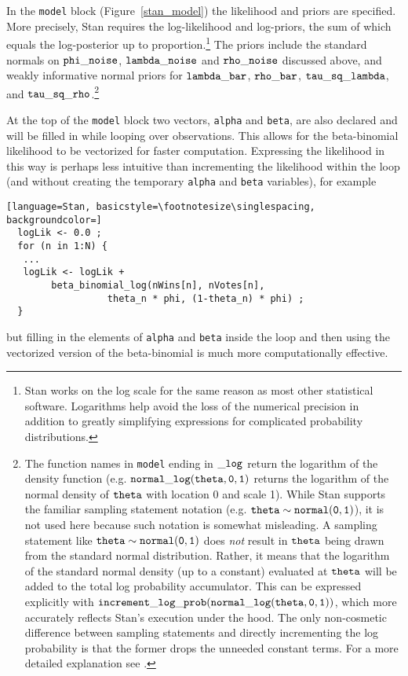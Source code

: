 In the {\tt model} block (Figure~\ref{stan_model}) the likelihood and priors are specified. More 
precisely, Stan requires the log-likelihood and log-priors, the sum of which equals the log-posterior 
up to proportion.\footnote{Stan works on the log scale for the same reason as most 
other statistical software. Logarithms help avoid the loss of the numerical precision in addition to 
greatly simplifying expressions for complicated probability distributions.}
The priors include the standard normals on ${\tt phi\_noise}$, ${\tt lambda\_noise}$ and ${\tt rho\_noise}$ 
discussed above, and weakly informative normal priors for 
${\tt lambda\_bar}$, ${\tt rho\_bar}$, ${\tt tau\_sq\_lambda}$, 
and ${\tt tau\_sq\_rho}$.\footnote{The function names in {\tt model} 
ending in ${\tt\_log}$ return the logarithm of the density function (e.g. ${\tt normal\_log(theta,0,1)}$ 
returns the logarithm of the normal density of ${\tt theta}$  with location 0 and scale 1). While Stan  
supports the familiar sampling statement notation (e.g. ${\tt theta \sim normal(0,1)}$), it is not 
used here because such notation is somewhat misleading. A sampling statement like 
${\tt theta \sim normal(0,1)}$ does {\it not} result in ${\tt theta}$ being drawn from the standard 
normal distribution. Rather, it means that the logarithm of the standard normal density (up to a constant) 
evaluated at ${\tt theta}$ will be added to the total log probability accumulator. This can be expressed 
explicitly with ${\tt increment\_log\_prob(normal\_log(theta,0,1))}$, which more accurately reflects 
Stan's execution under the hood. The only non-cosmetic difference between sampling statements and directly 
incrementing the log probability is that the former drops the unneeded constant terms. For a more detailed 
explanation see .}  

At the top of the {\tt model} block two vectors, {\tt alpha} and {\tt beta}, are also declared 
and will be filled in while looping over observations. This allows for the beta-binomial likelihood 
to be vectorized for faster computation. Expressing the likelihood in this way is perhaps less 
intuitive than incrementing the likelihood within the loop (and without creating the temporary 
{\tt alpha} and {\tt beta} variables), for example

\begin{lstlisting}[language=Stan, basicstyle=\footnotesize\singlespacing, backgroundcolor=]
  logLik <- 0.0 ;
  for (n in 1:N) {
   ...
   logLik <- logLik +
   		beta_binomial_log(nWins[n], nVotes[n], 
   				  theta_n * phi, (1-theta_n) * phi) ;
  }
\end{lstlisting}
%
\noindent but filling in the elements of {\tt alpha} and {\tt beta} inside the loop and then using the 
vectorized version of the beta-binomial is much more computationally effective. 

